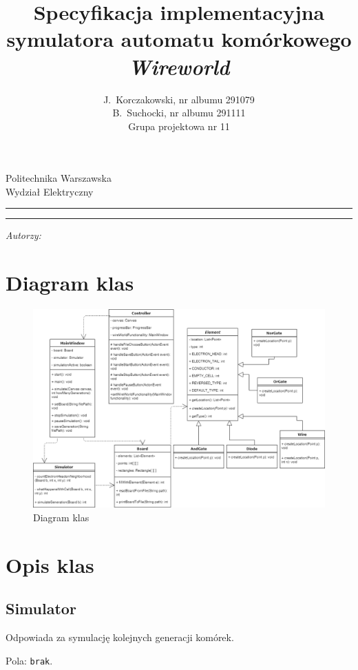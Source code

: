 \documentclass[a4paper,11pt, notitlepage ]{article}
\author{J.~Korczakowski, nr albumu 291079\\ B.~Suchocki, nr albumu 291111\\ Grupa projektowa nr 11}
\title{Specyfikacja implementacyjna symulatora automatu komórkowego \textsl{Wireworld}}
\makeatletter
\newcommand{\linia}{\rule{\linewidth}{0.4mm}}
\renewcommand{\maketitle}{\begin{titlepage}
    \vspace*{1cm}
    \begin{center}\small
    Politechnika Warszawska\\
    Wydział Elektryczny
    \end{center}
    \vspace{3cm}
    \noindent\linia
    \begin{center}
      \LARGE \textsc{\@title}
         \end{center}
     \linia
    \vspace{0.5cm}
    \begin{flushright}
    \begin{minipage}{8cm}
    \textit{\small Autorzy:}\\
    \normalsize \textsc{\@author} \par
    \end{minipage}
    \end{flushright}
    \vspace*{\stretch{6}}
    \begin{center}
    \@date
    \end{center}
  \end{titlepage}%
}
\makeatother
\begin{document}
\maketitle
\setcounter{page}{2}
\tableofcontents
\newpage

\section{Diagram klas}
\begin{figure}[h]
\centering
\includegraphics[width=13cm]{ClassDiagram}
\caption{Diagram klas}
\end{figure}

\section{Opis klas}

\subsection{Simulator}
Odpowiada za symulację kolejnych generacji komórek.


Pola: \verb+brak+.
\end{document}
